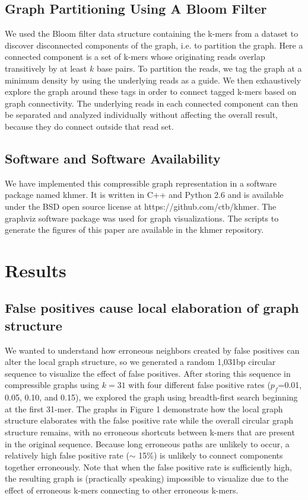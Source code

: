 \documentclass[12pt]{article} \usepackage{simplemargins}
\begin{document}
\subsection{Graph Partitioning Using A Bloom Filter}
We used the Bloom filter data structure containing the k-mers from a
dataset to discover disconnected components of the graph, i.e. to
partition the graph.  Here a connected component is a set of k-mers
whose originating reads overlap transitively by at least $k$ base
pairs.  To partition the reads, we tag the graph at a minimum density
by using the underlying reads as a guide. We then exhaustively explore
the graph around these tags in order to connect tagged k-mers based on
graph connectivity.  The underlying reads in each connected component
can then be separated and analyzed individually without affecting the
overall result, because they do connect outside that read set.


\subsection{Software and Software Availability}

We have implemented this compressible graph representation in a
software package named khmer.  It is written in C++ and Python 2.6 and
is available under the BSD open source license at
https://github.com/ctb/khmer.  The graphviz software package was used
for graph visualizations. The scripts to generate the figures of this
paper are available in the khmer repository.

\section{Results}

\subsection{False positives cause local elaboration of graph structure}

We wanted to understand how erroneous neighbors created by false
positives can alter the local graph structure, so we 
generated a random 1,031bp circular sequence to visualize the effect of false
positives.  After storing this sequence in compressible graphs using
$k=31$ with four different false positive rates ($p_f$=0.01, 0.05,
0.10, and 0.15), we explored the graph using breadth-first search
beginning at the first 31-mer.  The graphs in Figure 1 demonstrate how
the local graph structure elaborates with the false positive rate
while the overall circular graph structure remains, with no erroneous
shortcuts between k-mers that are present in the original
sequence. Because long erroneous paths are unlikely to occur, a
relatively high false positive rate ($\sim$ 15\%) is unlikely to
connect components together erroneously. Note that when the false
positive rate is sufficiently high, the resulting graph is
(practically speaking) impossible to visualize due to the effect of
erroneous k-mers connecting to other erroneous k-mers.
\end{document}
